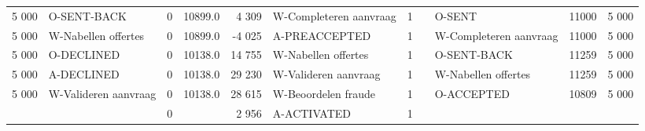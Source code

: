 \begin{tabular}{rlrlrlrllll}
5 000 & O-SENT-BACK & 0 & 10899.0 & 4 309 & W-Completeren aanvraag & 1 &  & O-SENT & 11000 & 5 000 \\
5 000 & W-Nabellen offertes & 0 & 10899.0 & -4 025 & A-PREACCEPTED & 1 &  & W-Completeren aanvraag & 11000 & 5 000 \\
5 000 & O-DECLINED & 0 & 10138.0 & 14 755 & W-Nabellen offertes & 1 &  & O-SENT-BACK & 11259 & 5 000 \\
5 000 & A-DECLINED & 0 & 10138.0 & 29 230 & W-Valideren aanvraag & 1 &  & W-Nabellen offertes & 11259 & 5 000 \\
5 000 & W-Valideren aanvraag & 0 & 10138.0 & 28 615 & W-Beoordelen fraude & 1 &  & O-ACCEPTED & 10809 & 5 000 \\
 &  & 0 &  & 2 956 & A-ACTIVATED & 1 &  &  &  &  \\
\bottomrule
\end{tabular}
